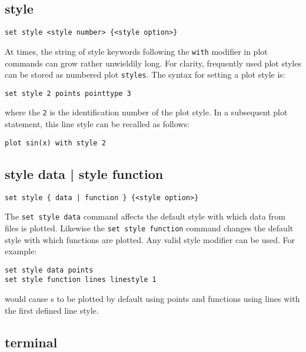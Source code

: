 \subsection{style}

\begin{verbatim}
set style <style number> {<style option>}
\end{verbatim}

At times, the string of style keywords following the {\tt with} modifier in
plot commands can grow rather unwieldily long. For clarity, frequently used
plot styles can be stored as numbered plot {\tt styles}. The syntax for setting
a plot style is:

\begin{verbatim}
set style 2 points pointtype 3
\end{verbatim}

\noindent where the {\tt 2} is the identification number of the plot style.
In a subsequent plot statement, this line style can be recalled as follows:

\begin{verbatim}
plot sin(x) with style 2
\end{verbatim}


\subsection{style data | style function}

\begin{verbatim}
set style { data | function } {<style option>}
\end{verbatim}

The {\tt set style data} command affects the default style with which data from
files is plotted.  Likewise the {\tt set style function} command changes the
default style with which functions are plotted.  Any valid style modifier can
be used.  For example:

\begin{verbatim}
set style data points
set style function lines linestyle 1
\end{verbatim}

\noindent would cause \datafile s to be plotted by default using points and
functions using lines with the first defined line style.


\subsection{terminal}

